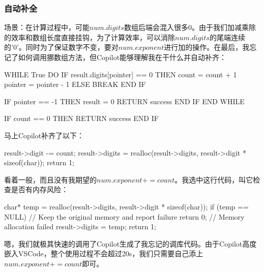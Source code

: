 \documentclass[11pt]{article}
\begin{document}
\subsubsection{自动补全}
场景：在计算过程中，可能$num.digits$数组后端会混入很多$0$。由于我们加减乘除的效率和数组长度直接挂钩，为了计算效率，可以消除$num.digits$的尾端连续的'0'。同时为了保证数字不变，要对$num.exponent$进行加的操作。在最后，我忘记了如何调用挪数组方法，但Copilot能够理解我在干什么并自动补齐：
\begin{commandline}
    WHILE True DO
        IF result.digits[pointer] == 0 THEN
            count = count + 1
            pointer = pointer - 1
        ELSE
            BREAK
        END IF
        
        IF pointer == -1 THEN
            result = {0}
            RETURN success
        END IF
    END WHILE
    
    IF count == 0 THEN
        RETURN success
    END IF
\end{commandline}
马上Copilot补齐了以下：
\begin{commandline}
result->digit -= count;
result->digits = realloc(result->digits, result->digit * sizeof(char));
return 1;    
\end{commandline}
看着一般，而且没有我期望的$num.exponent+=count$。我选中这行代码，叫它检查是否有内存风险：
\begin{commandline}
    char* temp = realloc(result->digits, result->digit * sizeof(char));
    if (temp == NULL) {
      // Keep the original memory and report failure
        return 0; // Memory allocation failed
    }
    result->digits = temp;
    return 1;
\end{commandline}
嗯，我们就极其快速的调用了Copilot生成了我忘记的调库代码。由于Copilot高度嵌入VSCode，整个使用过程不会超过20s，我们只需要自己添上$num.exponent+=count$即可。
\end{document}

